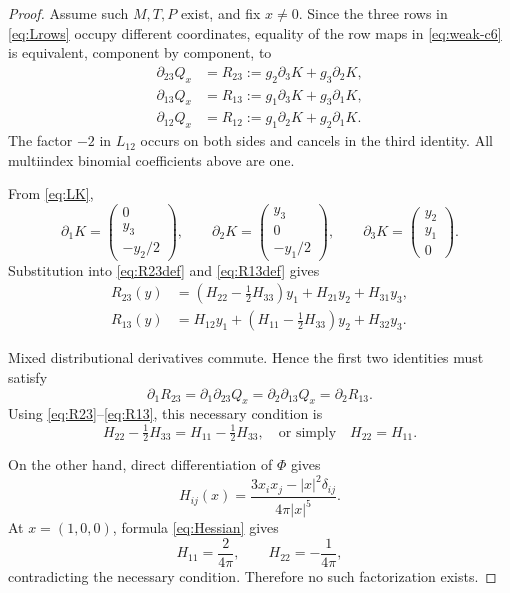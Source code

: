 \documentclass[11pt]{article}
\newcommand{\p}{\partial}
\begin{document}
\begin{proof}
Assume such \(M,T,P\) exist, and fix \(x\ne0\).  Since the three rows in
\eqref{eq:Lrows} occupy different coordinates, equality of the row maps in
\eqref{eq:weak-c6} is equivalent, component by component, to
\begin{align}
\p_{23}Q_x&=R_{23}:=g_2\p_3K+g_3\p_2K,\label{eq:R23def}\\
\p_{13}Q_x&=R_{13}:=g_1\p_3K+g_3\p_1K,\label{eq:R13def}\\
\p_{12}Q_x&=R_{12}:=g_1\p_2K+g_2\p_1K.\label{eq:R12def}
\end{align}
The factor \(-2\) in \(L_{12}\) occurs on both sides and cancels in the
third identity.  All multiindex binomial coefficients above are one.

From \eqref{eq:LK},
\[
\p_1K=\begin{pmatrix}0\\y_3\\-y_2/2\end{pmatrix},\qquad
\p_2K=\begin{pmatrix}y_3\\0\\-y_1/2\end{pmatrix},\qquad
\p_3K=\begin{pmatrix}y_2\\y_1\\0\end{pmatrix}.
\]
Substitution into \eqref{eq:R23def} and \eqref{eq:R13def} gives
\begin{align}
R_{23}(y)&=\left(H_{22}-\tfrac12H_{33}\right)y_1+H_{21}y_2+H_{31}y_3,
\label{eq:R23}\\
R_{13}(y)&=H_{12}y_1+\left(H_{11}-\tfrac12H_{33}\right)y_2+H_{32}y_3.
\label{eq:R13}
\end{align}

Mixed distributional derivatives commute.  Hence the first two identities
must satisfy
\[
\p_1R_{23}=\p_1\p_{23}Q_x
=\p_2\p_{13}Q_x=\p_2R_{13}.
\]
Using \eqref{eq:R23}--\eqref{eq:R13}, this necessary condition is
\[
H_{22}-\tfrac12H_{33}=H_{11}-\tfrac12H_{33},
\quad\text{or simply}\quad H_{22}=H_{11}.
\]

On the other hand, direct differentiation of \(\Phi\) gives
\begin{equation}\label{eq:Hessian}
H_{ij}(x)=\frac{3x_ix_j-|x|^2\delta_{ij}}{4\pi|x|^5}.
\end{equation}
At \(x=(1,0,0)\), formula \eqref{eq:Hessian} gives
\[
H_{11}=\frac{2}{4\pi},\qquad H_{22}=-\frac{1}{4\pi},
\]
contradicting the necessary condition.  Therefore no such factorization
exists.
\end{proof}
\end{document}

